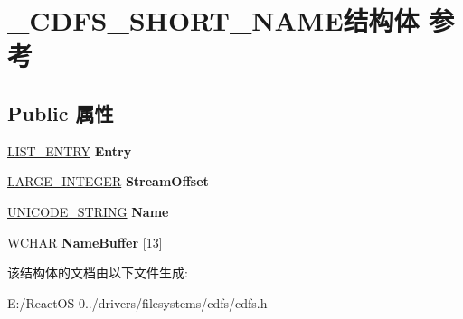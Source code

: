 \hypertarget{struct___c_d_f_s___s_h_o_r_t___n_a_m_e}{}\section{\+\_\+\+C\+D\+F\+S\+\_\+\+S\+H\+O\+R\+T\+\_\+\+N\+A\+M\+E结构体 参考}
\label{struct___c_d_f_s___s_h_o_r_t___n_a_m_e}
\subsection*{Public 属性}
\begin{DoxyCompactItemize}
\item 
\mbox{\label{struct___c_d_f_s___s_h_o_r_t___n_a_m_e_a731de37dda16a3e6c3761452dfa86166}} 
\hyperlink{struct___l_i_s_t___e_n_t_r_y}{L\+I\+S\+T\+\_\+\+E\+N\+T\+RY} {\bfseries Entry}
\item 
\mbox{\label{struct___c_d_f_s___s_h_o_r_t___n_a_m_e_ae0ed4dbbadd290773f24d511095d7bd0}} 
\hyperlink{union___l_a_r_g_e___i_n_t_e_g_e_r}{L\+A\+R\+G\+E\+\_\+\+I\+N\+T\+E\+G\+ER} {\bfseries Stream\+Offset}
\item 
\mbox{\label{struct___c_d_f_s___s_h_o_r_t___n_a_m_e_a9d930da2e49f0a39a69ea7b3918c83c4}} 
\hyperlink{struct___u_n_i_c_o_d_e___s_t_r_i_n_g}{U\+N\+I\+C\+O\+D\+E\+\_\+\+S\+T\+R\+I\+NG} {\bfseries Name}
\item 
\mbox{\label{struct___c_d_f_s___s_h_o_r_t___n_a_m_e_a02985879717312a71756484f7fb1a351}} 
W\+C\+H\+AR {\bfseries Name\+Buffer} \mbox{[}13\mbox{]}
\end{DoxyCompactItemize}


该结构体的文档由以下文件生成\+:\begin{DoxyCompactItemize}
\item 
E\+:/\+React\+O\+S-\/0../drivers/filesystems/cdfs/cdfs.\+h\end{DoxyCompactItemize}
